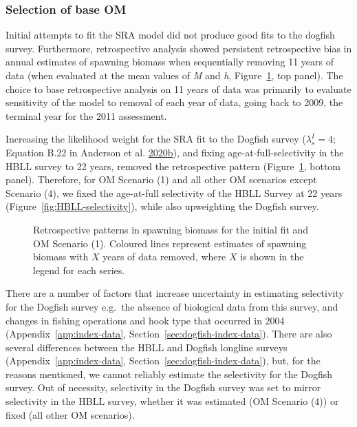 \documentclass[11pt]{book}
\begin{document}
\hypertarget{sec:approach3-conditioning-base-om}{%
\subsubsection{Selection of base OM}\label{sec:approach3-conditioning-base-om}}

Initial attempts to fit the SRA model did not produce good fits to the dogfish survey. Furthermore, retrospective analysis showed persistent retrospective bias in annual estimates of spawning biomass when sequentially removing 11 years of data (when evaluated at the mean values of \emph{M} and \emph{h}, Figure~\ref{fig:retro-initial}, top panel). The choice to base retrospective analysis on 11 years of data was primarily to evaluate sensitivity of the model to removal of each year of data, going back to 2009, the terminal year for the 2011 assessment.

Increasing the likelihood weight for the SRA fit to the Dogfish survey (\(\lambda^I_s = 4\); Equation B.22 in Anderson et al. \protect\hyperlink{ref-anderson2020gfmp}{2020}\protect\hyperlink{ref-anderson2020gfmp}{b}), and fixing age-at-full-selectivity in the HBLL survey to 22 years, removed the retrospective pattern (Figure~\ref{fig:retro-initial}, bottom panel). Therefore, for OM Scenario (1) and all other OM scenarios except Scenario (4), we fixed the age-at-full selectivity of the HBLL Survey at 22 years (Figure~\ref{fig:HBLL-selectivity}), while also upweighting the Dogfish survey.


\begin{figure}[htb]

{\centering {} 

}

\caption{Retrospective patterns in spawning biomass for the initial fit and OM Scenario (1). Coloured lines represent estimates of spawning biomass with \(X\) years of data removed, where \(X\) is shown in the legend for each series.}\label{fig:retro-initial}
\end{figure}
There are a number of factors that increase uncertainty in estimating selectivity for the Dogfish survey e.g.~the absence of biological data from this survey, and changes in fishing operations and hook type that occurred in 2004 (Appendix~\ref{app:index-data}, Section~\ref{sec:dogfish-index-data}). There are also several differences between the HBLL and Dogfish longline surveys (Appendix~\ref{app:index-data}, Section~\ref{sec:dogfish-index-data}), but, for the reasons mentioned, we cannot reliably estimate the selectivity for the Dogfish survey. Out of necessity, selectivity in the Dogfish survey was set to mirror selectivity in the HBLL survey, whether it was estimated (OM Scenario (4)) or fixed (all other OM scenarios).
\end{document}
